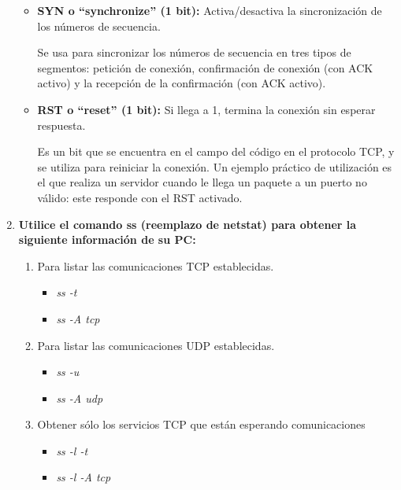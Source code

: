 \documentclass[a4paper,10pt]{article}
\begin{document}
\begin{enumerate}
\begin{itemize}
            \item \textbf{SYN o “synchronize” (1 bit):} Activa/desactiva la sincronización de los números de secuencia.
        
            Se usa para sincronizar los números de secuencia en tres tipos de segmentos: petición de conexión, confirmación de conexión (con ACK activo) y la recepción de la confirmación (con ACK activo).
            
            \item \textbf{RST o “reset” (1 bit):} Si llega a 1, termina la conexión sin esperar respuesta.
        
            Es un bit que se encuentra en el campo del código en el protocolo TCP, y se utiliza para reiniciar la conexión. Un ejemplo práctico de utilización es el que realiza un servidor cuando le llega un paquete a un puerto no válido: este responde con el RST activado.
        \end{itemize}
        
    \item \textbf{Utilice el comando ss (reemplazo de netstat) para obtener la siguiente información de su PC:}
        \begin{enumerate}
            \item Para listar las comunicaciones TCP establecidas.
            
                \begin{itemize}
                    \item \textit{ss -t}
                    \item \textit{ss -A tcp}
                \end{itemize}
            
            \item Para listar las comunicaciones UDP establecidas.
            
                \begin{itemize}
                    \item \textit{ss -u}
                    \item \textit{ss -A udp}
                \end{itemize}
                
            \item Obtener sólo los servicios TCP que están esperando comunicaciones
            
                \begin{itemize}
                    \item \textit{ss -l -t}
                    \item \textit{ss -l -A tcp}
                \end{itemize}
                

\end{enumerate}
\end{enumerate}
\end{document}
